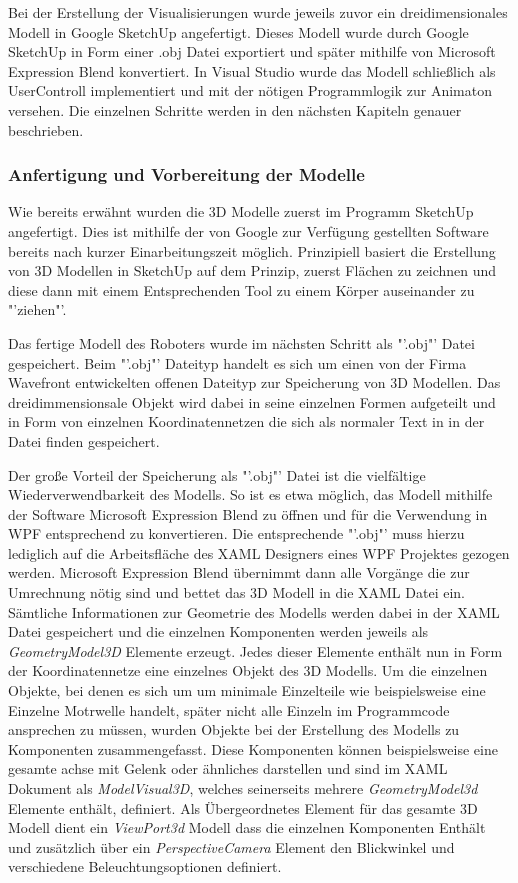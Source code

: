 Bei der Erstellung der Visualisierungen wurde jeweils zuvor ein dreidimensionales Modell in Google SketchUp angefertigt. Dieses Modell wurde durch Google SketchUp in Form einer .obj Datei exportiert und später mithilfe von Microsoft Expression Blend konvertiert. In Visual Studio wurde das Modell schließlich als UserControll implementiert und mit der nötigen Programmlogik zur Animaton versehen.
Die einzelnen Schritte werden in den nächsten Kapiteln genauer beschrieben.
\subsubsection{Anfertigung und Vorbereitung der Modelle}
Wie bereits erwähnt wurden die 3D Modelle zuerst im Programm SketchUp angefertigt. Dies ist mithilfe der von Google zur Verfügung gestellten Software bereits nach kurzer Einarbeitungszeit möglich. 
Prinzipiell basiert die Erstellung von 3D Modellen in SketchUp auf dem Prinzip, zuerst Flächen zu zeichnen und diese dann mit einem Entsprechenden Tool zu einem Körper auseinander zu "'ziehen"'.

Das fertige Modell des Roboters wurde im nächsten Schritt als "'.obj"' Datei gespeichert. Beim "'.obj"' Dateityp handelt es sich um einen von der Firma Wavefront entwickelten offenen Dateityp zur Speicherung von 3D Modellen. Das dreidimmensionsale Objekt wird dabei in seine einzelnen Formen aufgeteilt und in Form von einzelnen Koordinatennetzen die sich als normaler Text in in der Datei finden gespeichert.

Der große Vorteil der Speicherung als "'.obj"' Datei ist die vielfältige Wiederverwendbarkeit des Modells. So ist es etwa möglich, das Modell mithilfe der Software Microsoft Expression Blend zu öffnen und für die Verwendung in WPF entsprechend zu konvertieren. Die entsprechende "'.obj"' muss hierzu lediglich auf die Arbeitsfläche des XAML Designers eines WPF Projektes gezogen werden. Microsoft Expression Blend übernimmt dann alle Vorgänge die zur Umrechnung nötig sind und bettet das 3D Modell in die XAML Datei ein. 
Sämtliche Informationen zur Geometrie des Modells werden dabei in der XAML Datei gespeichert und die einzelnen Komponenten werden jeweils als \textit{GeometryModel3D} Elemente erzeugt.
Jedes dieser Elemente enthält nun in Form der Koordinatennetze eine einzelnes Objekt des 3D Modells. Um die einzelnen Objekte, bei denen es sich um um minimale Einzelteile wie beispielsweise eine Einzelne Motrwelle handelt, später nicht alle Einzeln im Programmcode ansprechen zu müssen, wurden Objekte bei der Erstellung des Modells zu Komponenten zusammengefasst. Diese Komponenten können beispielsweise eine gesamte achse mit Gelenk oder ähnliches darstellen und sind im XAML Dokument als \textit{ModelVisual3D}, welches seinerseits mehrere \textit{GeometryModel3d} Elemente enthält, definiert.
Als Übergeordnetes Element für das gesamte 3D Modell dient ein \textit{ViewPort3d} Modell dass die einzelnen Komponenten Enthält und zusätzlich über ein \textit{PerspectiveCamera} Element den Blickwinkel und verschiedene Beleuchtungsoptionen definiert.

